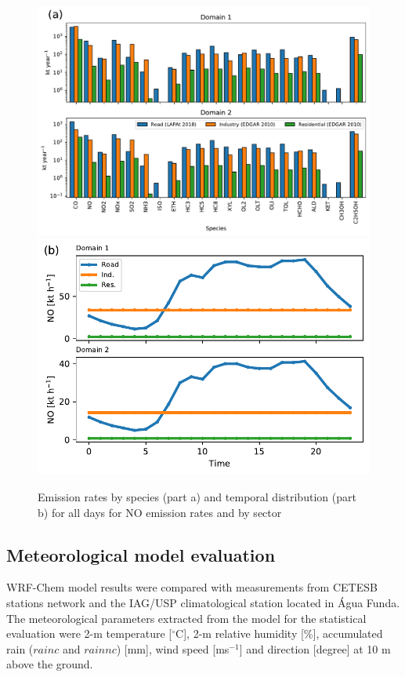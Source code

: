 	\begin{figure}[htpb]
		\centering
		\includegraphics[width=.8\textwidth]{fig/emi_kt.pdf}
		\includegraphics[width=.8\textwidth]{fig/emi_NO_time_kt.pdf}
  		\caption{Emission rates by species (part a) and temporal distribution (part b) for all days for NO emission rates and by sector}	
  		\label{fig:emiss_temp}
	\end{figure}
	
	
	
  \subsection{Meteorological model evaluation}\label{subsec:res_met}
  WRF-Chem model results were compared with measurements from CETESB stations network and the IAG/USP climatological station located in Água Funda.
The meteorological parameters extracted from the model for the statistical evaluation were 2-m temperature [$^\circ$C], 2-m relative humidity [\%], accumulated rain ($rainc$ and $rainnc$) [mm], wind speed [ms$^{-1}$] and direction [degree] at 10 m above the ground.

